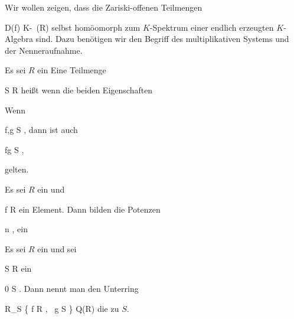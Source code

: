 \setcounter{section}{13}







Wir wollen zeigen, dass die Zariski-offenen Teilmengen

\mavergleichskette
{\vergleichskette
{  D(f)
}
{ \subseteq }{ K-\, (R)
}
{  }{
}
{    }{
}
{   }{
}
}
{}{}{}
selbst homöomorph zum $K$-Spektrum einer endlich erzeugten $K$-Algebra sind. Dazu benötigen wir den Begriff des multiplikativen Systems und der Nenneraufnahme.


{}
{





Es sei $R$ ein
Eine Teilmenge

\mavergleichskette
{\vergleichskette
{S
}
{ \subseteq }{ R
}
{  }{
}
{    }{
}
{   }{
}
}
{}{}{}
heißt  wenn die beiden Eigenschaften
 {Wenn

\mavergleichskette
{\vergleichskette
{f,g
}
{ \in }{ S
}
{  }{
}
{    }{
}
{   }{
}
}
{}{}{,}
dann ist auch

\mavergleichskette
{\vergleichskette
{fg
}
{ \in }{ S
}
{  }{
}
{    }{
}
{   }{
}
}
{}{}{,}
}
gelten.





}

{





Es sei $R$ ein
und

\mavergleichskette
{\vergleichskette
{f
}
{ \in }{ R
}
{  }{
}
{    }{
}
{   }{
}
}
{}{}{}
ein Element. Dann bilden die Potenzen

 {}
 {n \in \N} {}
 {} {} {} {,}
ein





}


{}
{





Es sei $R$ ein
und sei

\mavergleichskette
{\vergleichskette
{S
}
{ \subseteq }{R
}
{  }{
}
{    }{
}
{   }{
}
}
{}{}{}
ein

\mavergleichskette
{\vergleichskette
{ 0
}
{ \notin }{ S
}
{  }{
}
{    }{
}
{   }{
}
}
{}{}{.}
Dann nennt man den Unterring

\mavergleichskettedisp
{\vergleichskette
{  R_S
}
{ } { \left\{     \mid   f \in R , \,  g \in S       \right\}
}
{ \subseteq} { Q(R)
}
{ } {
}
{ } {
}
}
{}{}{}
die  zu $S$.





}

